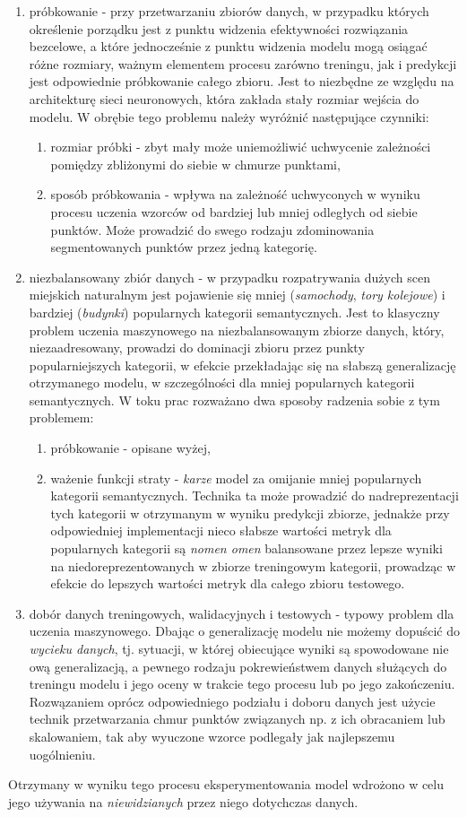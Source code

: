 \begin{enumerate}
    \item próbkowanie - przy przetwarzaniu zbiorów danych, w przypadku których określenie porządku jest z punktu widzenia efektywności rozwiązania bezcelowe, a które jednocześnie z punktu widzenia modelu mogą osiągać różne rozmiary, ważnym elementem procesu zarówno treningu, jak i predykcji jest odpowiednie próbkowanie całego zbioru. Jest to niezbędne ze względu na architekturę sieci neuronowych, która zakłada stały rozmiar wejścia do modelu. W obrębie tego problemu należy wyróżnić następujące czynniki:
    \begin{enumerate}
        \item rozmiar próbki - zbyt mały może uniemożliwić uchwycenie zależności pomiędzy zbliżonymi do siebie w chmurze punktami,
        \item sposób próbkowania - wpływa na zależność uchwyconych w wyniku procesu uczenia wzorców od bardziej lub mniej odległych od siebie punktów. Może prowadzić do swego rodzaju zdominowania segmentowanych punktów przez jedną kategorię.
    \end{enumerate}
    \item niezbalansowany zbiór danych - w przypadku rozpatrywania dużych scen miejskich naturalnym jest pojawienie się mniej (\textit{samochody}, \textit{tory kolejowe}) i bardziej (\textit{budynki}) popularnych kategorii semantycznych. Jest to klasyczny problem uczenia maszynowego na niezbalansowanym zbiorze danych, który, niezaadresowany, prowadzi do dominacji zbioru przez punkty popularniejszych kategorii, w efekcie przekładając się na słabszą generalizację otrzymanego modelu, w szczególności dla mniej popularnych kategorii semantycznych. W toku prac rozważano dwa sposoby radzenia sobie z tym problemem:
    \begin{enumerate}
        \item próbkowanie - opisane wyżej,
        \item ważenie funkcji straty - \textit{karze} model za omijanie mniej popularnych kategorii semantycznych. Technika ta może prowadzić do nadreprezentacji tych kategorii w otrzymanym w wyniku predykcji zbiorze, jednakże przy odpowiedniej implementacji nieco słabsze wartości metryk dla popularnych kategorii są \textit{nomen omen} balansowane przez lepsze wyniki na niedoreprezentowanych w zbiorze treningowym kategorii, prowadząc w efekcie do lepszych wartości metryk dla całego zbioru testowego.
    \end{enumerate}
    \item dobór danych treningowych, walidacyjnych i testowych - typowy problem dla uczenia maszynowego. Dbając o generalizację modelu nie możemy dopuścić do \textit{wycieku danych}, tj. sytuacji, w której obiecujące wyniki są spowodowane nie ową generalizacją, a pewnego rodzaju pokrewieństwem danych służących do treningu modelu i jego oceny w trakcie tego procesu lub po jego zakończeniu. Rozwązaniem oprócz odpowiedniego podziału i doboru danych jest użycie technik przetwarzania chmur punktów związanych np. z ich obracaniem lub skalowaniem, tak aby wyuczone wzorce podlegały jak najlepszemu uogólnieniu.
\end{enumerate}
Otrzymany w wyniku tego procesu eksperymentowania model wdrożono w celu jego używania na \textit{niewidzianych} przez niego dotychczas danych.